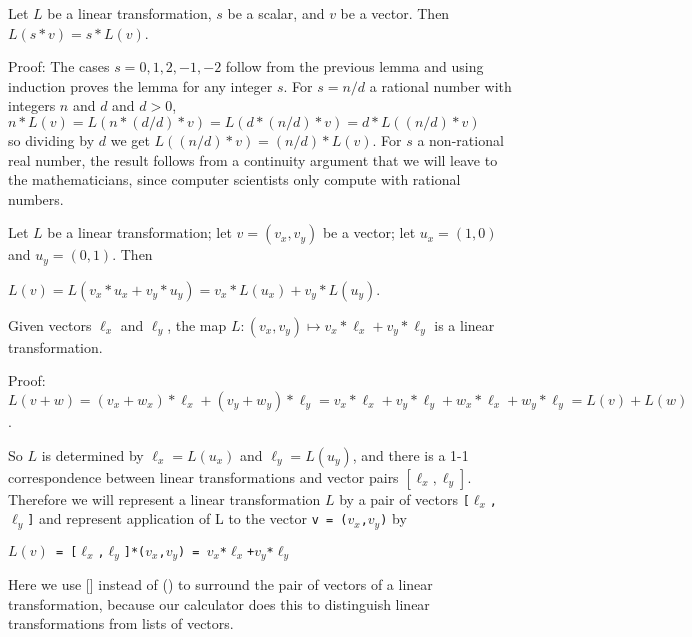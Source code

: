 \documentclass[12pt]{article}
\begin{document}
\begin{lemma}
Let $L$ be a linear transformation, $s$ be a scalar, and $v$ be a vector.
Then $L(s*v)=s*L(v)$.
\end{lemma}
\begin{indpar}{0.5in}
Proof: The cases $s=0,1,2,-1,-2$ follow from the previous lemma and
using induction proves the lemma for any integer $s$.  For $s=n/d$
a rational number with integers $n$ and $d$ and $d>0$, \\
\hspace*{0.1in}$n*L(v) = L(n*(d/d)*v) = L(d*(n/d)*v)=d*L((n/d)*v)$ \\
so dividing by $d$
we get $L((n/d)*v)=(n/d)*L(v)$.  For $s$ a non-rational real number,
the result follows from a continuity argument that we will leave
to the mathematicians, since computer scientists only compute
with rational numbers.
\end{indpar}

Let $L$ be a linear transformation; let $v=(v_x,v_y)$ be a vector;
let $u_x=(1,0)$ and $u_y =(0,1)$.  Then \\
\centerline{$L(v) = L(v_x*u_x+v_y*u_y)=v_x*L(u_x)+v_y*L(u_y)$.}

\begin{lemma}
Given vectors $\ell_x$ and $\ell_y$, the map
$L:(v_x,v_y)\longmapsto v_x*\ell_x+v_y*\ell_y$ is a linear
transformation.
\end{lemma}
\begin{indpar}{0.5in}
Proof: $L(v+w) = (v_x+w_x)*\ell_x+(v_y+w_y)*\ell_y
               = v_x*\ell_x+v_y*\ell_y+w_x*\ell_x+w_y*\ell_y
	       = L(v) + L(w)$.
\end{indpar}

So $L$ is determined by $\ell_x = L(u_x)$ and $\ell_y = L(u_y)$,
and there is a 1-1 correspondence between linear transformations
and vector pairs $[\ell_x,\ell_y]$.  Therefore we will represent a linear
transformation $L$ by a pair of vectors {\tt [$\ell_x$,$\ell_y$]}
and represent application of L to the vector {\tt v = ($v_x$,$v_y$)} by \\
\centerline{\tt $L(v)$ = [$\ell_x$,$\ell_y$]*($v_x$,$v_y$) =
             $v_x$*$\ell_x$+$v_y$*$\ell_y$}
Here we use [] instead of () to surround the pair of vectors of a linear
transformation, because our calculator does this to distinguish linear
transformations from lists of vectors.
\end{document}
